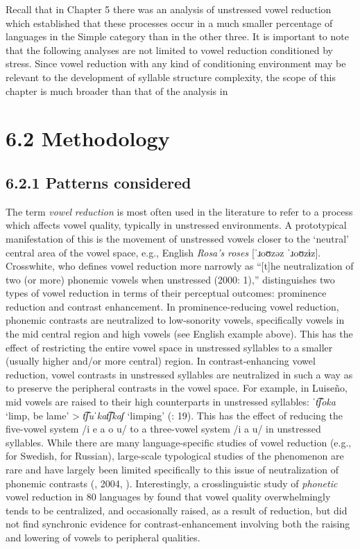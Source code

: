   Recall that in Chapter 5 there was an analysis of unstressed vowel reduction which established that these processes occur in a much smaller percentage of languages in the Simple category than in the other three. It is important to note that the following analyses are not limited to vowel reduction conditioned by stress. Since vowel reduction with any kind of conditioning environment may be relevant to the development of syllable structure complexity, the scope of this chapter is much broader than that of the analysis in 


\section{6.2  Methodology}
\subsection{6.2.1  Patterns considered}

  The term \textit{vowel} \textit{reduction} is most often used in the literature to refer to a process which affects vowel quality, typically in unstressed environments. A prototypical manifestation of this is the movement of unstressed vowels closer to the ‘neutral’ central area of the vowel space, e.g., English \textit{Rosa’s} \textit{roses} [\textit{ˈ}ɹoʊzəz \textit{ˈ}ɹoʊzɨz]. Crosswhite, who defines vowel reduction more narrowly as “[t]he neutralization of two (or more) phonemic vowels when unstressed (2000: 1),” distinguishes two types of vowel reduction in terms of their perceptual outcomes: prominence reduction and contrast enhancement. In prominence-reducing vowel reduction, phonemic contrasts are neutralized to low-sonority vowels, specifically vowels in the mid central region and high vowels (see English example above). This has the effect of restricting the entire vowel space in unstressed syllables to a smaller (usually higher and/or more central) region. In contrast-enhancing vowel reduction, vowel contrasts in unstressed syllables are neutralized in such a way as to preserve the peripheral contrasts in the vowel space. For example, in Luiseño, mid vowels are raised to their high counterparts in unstressed syllables: \textit{ˈt͡ʃoka} ‘limp, be lame’ > \textit{t͡ʃuˈkat͡ʃkaʃ} ‘limping’ (\citealt{MunroBenson1973}: 19). This has the effect of reducing the five-vowel system /i e a o u/ to a three-vowel system /i a u/ in unstressed syllables. While there are many language-specific studies of vowel reduction (e.g., \citealt{Lindblom1963} for Swedish, \citealt{PadgettTabain2005} for Russian), large-scale typological studies of the phenomenon are rare and have largely been limited specifically to this issue of neutralization of phonemic contrasts (\citealt{Crosswhite2001}, 2004, \citealt{Barnes2006}). Interestingly, a crosslinguistic study of \textit{phonetic} vowel reduction in 80 languages by \citet{KapatsinskiEtAl2019} found that vowel quality overwhelmingly tends to be centralized, and occasionally raised, as a result of reduction, but did not find synchronic evidence for contrast-enhancement involving both the raising and lowering of vowels to peripheral qualities.



